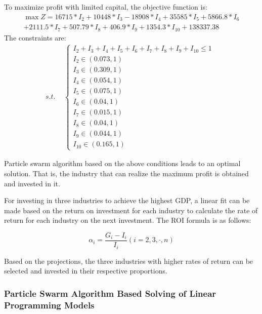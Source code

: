 \documentclass[12pt]{article}  %
\begin{document}
	To maximize profit with limited capital, the objective function is:
		\begin{equation}
		\begin{array}{l}
		\max Z = 16715*{I_2} + 10448*{I_3} - 18908*{I_4} + 35585*{I_5} + 5866.8*{I_6}\\
		+ 2111.5*{I_7} + 507.79*{I_8} + 406.9*{I_9} + 1354.3*{I_{10}} + 138337.38
		\end{array}
		\end{equation}
	The constraints are:
	\begin{equation}
		s.t.\begin{aligned}
			& \left\{
			\begin{array}{l}
				I_2 + I_3 + I_4 + I_5 + I_6 + I_7 + I_8 + I_9 + I_{10} \le 1 \\
				I_2 \in (0.073, 1) \\
				I_3 \in (0.309, 1) \\
				I_4 \in (0.054, 1) \\
				I_5 \in (0.075, 1) \\
				I_6 \in (0.04, 1) \\
				I_7 \in (0.015, 1) \\
				I_8 \in (0.04, 1) \\
				I_9 \in (0.044, 1) \\
				I_{10} \in (0.165, 1)
			\end{array}
			\right.
		\end{aligned}
	\end{equation}

	Particle swarm algorithm based on the above conditions leads to an optimal solution. That is, the industry that can realize the maximum profit is obtained and invested in it.

	For investing in three industries to achieve the highest GDP, a linear fit can be made based on the return on investment for each industry to calculate the rate of return for each industry on the next investment. The ROI formula is as follows:
	
	\begin{equation}
	{\alpha _i} = \frac{{{G_i} - {I_i}}}{{{I_i}}}(i = 2,3, \cdot,n)
	\end{equation}

	Based on the projections, the three industries with higher rates of return can be selected and invested in their respective proportions.


\subsubsection{Particle Swarm Algorithm Based Solving of Linear Programming Models}
\end{document}
